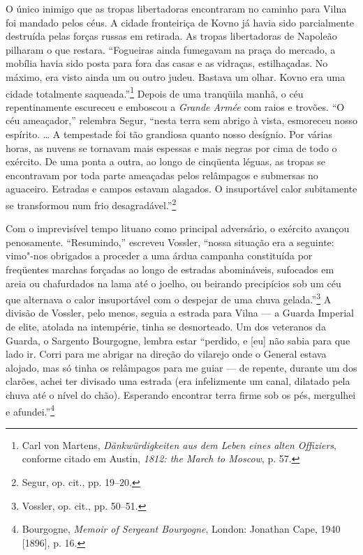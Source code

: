 O único inimigo que as tropas libertadoras encontraram no caminho para
Vilna foi mandado pelos céus. A cidade fronteiriça de Kovno já havia
sido parcialmente destruída pelas forças russas em retirada. As tropas
libertadoras de Napoleão pilharam o que restara. ``Fogueiras ainda
fumegavam na praça do mercado, a mobília havia sido posta para fora das
casas e as vidraças, estilhaçadas. No máximo, era visto ainda um ou
outro judeu. Bastava um olhar. Kovno era uma cidade totalmente
saqueada.''\footnote{Carl von Martens, \emph{Dänkwürdigkeiten aus dem
  Leben eines alten Offiziers}, conforme citado em Austin, \emph{1812:
  the March to Moscow}, p. 57.} Depois de uma tranqüila manhã, o céu
repentinamente escureceu e emboscou a \emph{Grande Armée} com raios e
trovões. ``O céu ameaçador,'' relembra Segur, ``nesta terra sem abrigo à
vista, esmoreceu nosso espírito. \ldots{} A tempestade foi tão grandiosa
quanto nosso desígnio. Por várias horas, as nuvens se tornavam mais
espessas e mais negras por cima de todo o exército. De uma ponta a
outra, ao longo de cinqüenta léguas, as tropas se encontravam por toda
parte ameaçadas pelos relâmpagos e submersas no aguaceiro. Estradas e
campos estavam alagados. O insuportável calor subitamente se transformou
num frio desagradável.''\footnote{Segur, op. cit., pp. 19--20.}

Com o imprevisível tempo lituano como principal adversário, o exército
avançou penosamente. ``Resumindo,'' escreveu Vossler, ``nossa situação
era a seguinte: vimo"-nos obrigados a proceder a uma árdua campanha
constituída por freqüentes marchas forçadas ao longo de estradas
abomináveis, sufocados em areia ou chafurdados na lama até o joelho, ou
beirando precipícios sob um céu que alternava o calor insuportável com o
despejar de uma chuva gelada.''\footnote{Vossler, op. cit., pp. 50--51.}
A divisão de Vossler, pelo menos, seguia a estrada para Vilna --- a Guarda
Imperial de elite, atolada na intempérie, tinha se desnorteado. Um dos
veteranos da Guarda, o Sargento Bourgogne, lembra estar ``perdido, e
{[}eu{]} não sabia para que lado ir. Corri para me abrigar na direção do
vilarejo onde o General estava alojado, mas só tinha os relâmpagos para
me guiar --- de repente, durante um dos clarões, achei ter divisado uma
estrada (era infelizmente um canal, dilatado pela chuva até o nível do
chão). Esperando encontrar terra firme sob os pés, mergulhei e
afundei.''\footnote{Bourgogne, \emph{Memoir of Sergeant Bourgogne},
  London: Jonathan Cape, 1940 {[}1896{]}, p. 16.}

